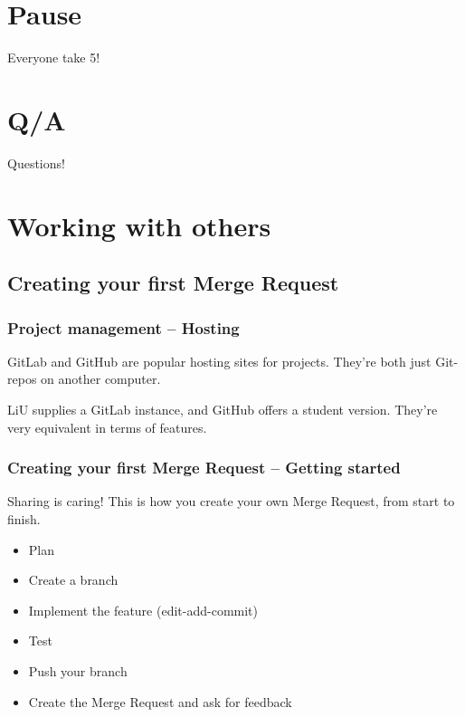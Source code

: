 \documentclass{beamer}
\begin{document}
\section{Pause}

\begin{frame}[fragile]
  \begin{center}
    Everyone take 5!
  \end{center}
\end{frame}

\section{Q/A}

\begin{frame}[fragile]
  \begin{center}
    Questions!
  \end{center}
\end{frame}

\section{Working with others}
\subsection{Creating your first Merge Request}

\begin{frame}[fragile]
  \frametitle{Project management -- Hosting}
  \vspace{1em}

  GitLab and GitHub are popular hosting sites for projects.
  They're both just Git-repos on another computer.
  \vspace{1em}

  LiU supplies a GitLab instance, and GitHub offers a student version.
  They're very equivalent in terms of features.

\end{frame}

\begin{frame}[fragile]
  \frametitle{Creating your first Merge Request -- Getting started}
  Sharing is caring! This is how you create your own Merge Request, from start
  to finish.
  \pause{}
  \begin{itemize}[<+->]
    \item Plan
    \item Create a branch
    \item Implement the feature (edit-add-commit)
    \item Test
    \item Push your branch
    \item Create the Merge Request and ask for feedback
  \end{itemize}
\end{frame}
\end{document}
